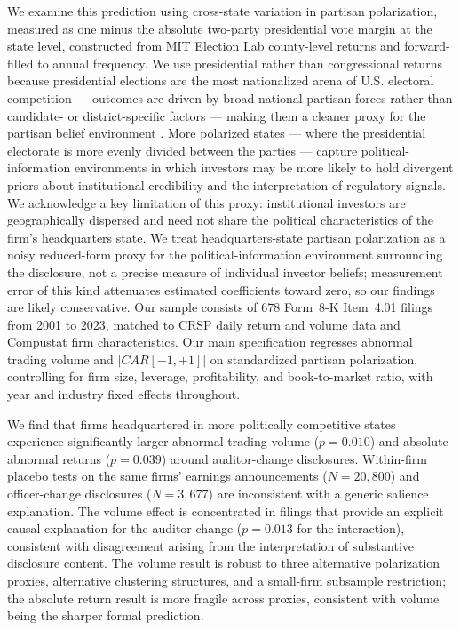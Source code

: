 \documentclass[12pt]{article}
\begin{document}
We examine this prediction using cross-state variation in partisan polarization,
measured as one minus the absolute two-party presidential vote margin at the
state level, constructed from MIT Election Lab county-level returns and
forward-filled to annual frequency.
We use presidential rather than congressional returns because presidential
elections are the most nationalized arena of U.S. electoral competition ---
outcomes are driven by broad national partisan forces rather than candidate-
or district-specific factors --- making them a cleaner proxy for the partisan
belief environment \citep{vertz1987, abramowitz2016, moskowitz2021}.
More polarized states --- where the presidential electorate is more evenly
divided between the parties --- capture political-information environments in
which investors may be more likely to hold divergent priors about institutional
credibility and the interpretation of regulatory signals. We acknowledge a key
limitation of this proxy: institutional investors are geographically dispersed
and need not share the political characteristics of the firm's headquarters
state. We treat headquarters-state partisan polarization as a noisy
reduced-form proxy for the political-information environment surrounding the
disclosure, not a precise measure of individual
investor beliefs; measurement error
of this kind attenuates estimated coefficients toward zero, so our findings are
likely conservative. Our sample consists of 678 Form~8-K Item~4.01 filings from
2001 to 2023, matched to CRSP daily return and volume data and Compustat firm
characteristics. Our main specification regresses abnormal
trading volume and $|CAR[-1,+1]|$ on standardized partisan polarization, controlling for firm size,
leverage, profitability, and book-to-market ratio, with year and industry
fixed effects throughout.

We find that firms headquartered in more politically competitive states experience
significantly larger abnormal trading volume ($p = 0.010$) and absolute abnormal
returns ($p = 0.039$) around auditor-change disclosures. Within-firm placebo
tests on the same firms' earnings announcements ($N = 20{,}800$) and
officer-change disclosures ($N = 3{,}677$) are inconsistent with a generic
salience explanation. The volume effect is concentrated in filings that provide
an explicit causal explanation for the auditor change ($p = 0.013$ for the
interaction), consistent with disagreement arising from the interpretation of
substantive disclosure content. The volume result is robust to three alternative
polarization proxies, alternative clustering structures, and a small-firm
subsample restriction; the absolute return result is more fragile across proxies,
consistent with volume being the sharper formal prediction.
\end{document}
